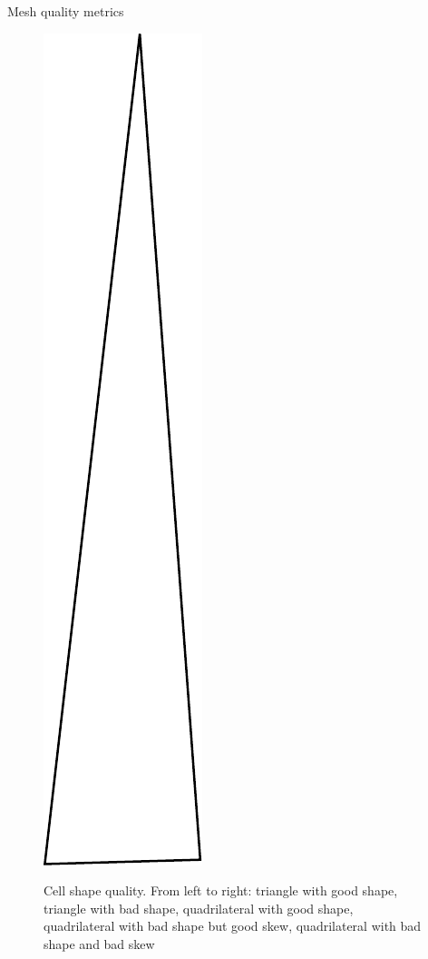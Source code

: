 \documentclass[t,12pt]{beamer}
\begin{document}
\begin{frame}{Mesh quality metrics}
\begin{figure}
{ 		\includegraphics[scale=0.15]{tri_bad}
 	}
 	\hspace{0.2in}
 	\caption{Cell shape quality. From left to right: triangle with good shape, triangle with bad shape, quadrilateral with good shape, quadrilateral with bad shape but good skew, quadrilateral with bad shape and bad skew}
 	\label{fig:shape}
 \end{figure}
\end{frame}
\end{document}
